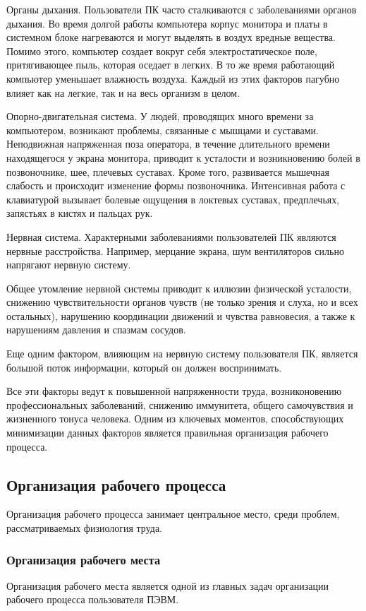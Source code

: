 Органы дыхания. Пользователи ПК часто сталкиваются с заболеваниями органов дыхания. Во время долгой работы компьютера корпус монитора и платы в системном блоке нагреваются и могут выделять в воздух вредные вещества. Помимо этого, компьютер создает вокруг себя электростатическое поле, притягивающее пыль, которая оседает в легких. В то же время работающий компьютер уменьшает влажность воздуха. Каждый из этих факторов пагубно влияет как на легкие, так и на весь организм в целом.

Опорно-двигательная система. У людей, проводящих много времени за компьютером, возникают проблемы, связанные с мышцами и суставами. Неподвижная напряженная поза оператора, в течение длительного времени находящегося у экрана монитора, приводит к усталости и возникновению болей в позвоночнике, шее, плечевых суставах. Кроме того, развивается мышечная слабость и происходит изменение формы позвоночника. Интенсивная работа с клавиатурой вызывает болевые ощущения в локтевых суставах, предплечьях, запястьях в кистях и пальцах рук.

Нервная система. Характерными заболеваниями пользователей ПК являются нервные расстройства. Например, мерцание экрана, шум вентиляторов сильно напрягают нервную систему.

Общее утомление нервной системы приводит к иллюзии физической усталости, снижению чувствительности органов чувств (не только зрения и слуха, но и всех остальных), нарушению координации движений и чувства равновесия, а также к нарушениям давления и спазмам сосудов.

Еще одним фактором, влияющим на нервную систему пользователя ПК, является большой поток информации, который он должен воспринимать.

Все эти факторы ведут к повышенной напряженности труда, возниконовению профессиональных заболеваний, снижению иммунитета, общего самочувствия и жизненного тонуса человека. Одним из ключевых моментов, способствующих минимизации данных факторов является правильная организация рабочего процесса.

\subsection{Организация рабочего процесса}
Организация рабочего процесса занимает центральное место, среди проблем, рассматриваемых физиология труда.
\subsubsection{Организация рабочего места}
Организация рабочего места является одной из главных задач организации рабочего процесса пользователя ПЭВМ.

